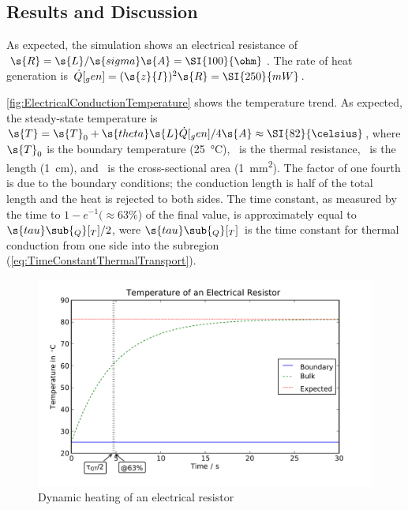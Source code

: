 \subsection{Results and Discussion}



As expected, the simulation shows an electrical resistance of $\s{R} = \s{L}/\s{sigma}\s{A} = \SI{100}{\ohm}$.  The rate of heat generation is $\dot{Q}[_gen] = (\s{z}{I})^2\s{R} = \SI{250}{mW}$.  

\autoref{fig:ElectricalConductionTemperature} shows the temperature trend.  As expected, the steady-state temperature is $\s{T} = \s{T}_0 + \s{theta}\s{L}\dot{Q}[_gen]/4\s{A} \approx \SI{82}{\celsius}$, where $\s{T}_0$ is the boundary temperature (\SI{25}{\celsius}), ~is the thermal resistance, ~is the length (\SI{1}{cm}), and ~is the cross-sectional area (\SI{1}{mm^2}).  The factor of one fourth is due to the boundary conditions; the conduction length is half of the total length and the heat is rejected to both sides.  The time constant, as measured by the time to $1 - e^{-1} (\approx 63\%$) of the final value, is approximately equal to $\s{tau}\sub{_Q}[_T]/2$, were $\s{tau}\sub{_Q}[_T]$~is the time constant for thermal conduction from one side into the subregion (\autoref{eq:TimeConstantThermalTransport}).

\begin{figure}[htbp]
  \includegraphics[width=\linewidth]{Results/Basic/ElectricalConduction/Temperature}%
  \caption{Dynamic heating of an electrical resistor}%
  \label{fig:ElectricalConductionTemperature}
\end{figure}


\FloatBarrier %
